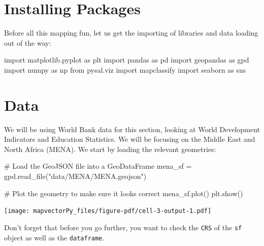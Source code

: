 \documentclass[
  letterpaper,
  DIV=11,
  numbers=noendperiod]{scrreprt}
\newenvironment{Shaded}{\begin{snugshade}}{\end{snugshade}}
\newcommand{\CommentTok}[1]{\textcolor[rgb]{0.37,0.37,0.37}{#1}}
\newcommand{\ImportTok}[1]{\textcolor[rgb]{0.00,0.46,0.62}{#1}}
\newcommand{\NormalTok}[1]{\textcolor[rgb]{0.00,0.23,0.31}{#1}}
\newcommand{\OperatorTok}[1]{\textcolor[rgb]{0.37,0.37,0.37}{#1}}
\newcommand{\StringTok}[1]{\textcolor[rgb]{0.13,0.47,0.30}{#1}}
\begin{document}
\section*{Installing Packages}\label{installing-packages}


Before all this mapping fun, let us get the importing of libraries and
data loading out of the way:

\begin{Shaded}
\begin{Highlighting}[]
\ImportTok{import}\NormalTok{ matplotlib.pyplot }\ImportTok{as}\NormalTok{ plt}
\ImportTok{import}\NormalTok{ pandas }\ImportTok{as}\NormalTok{ pd}
\ImportTok{import}\NormalTok{ geopandas }\ImportTok{as}\NormalTok{ gpd}
\ImportTok{import}\NormalTok{ numpy }\ImportTok{as}\NormalTok{ np}
\ImportTok{from}\NormalTok{ pysal.viz }\ImportTok{import}\NormalTok{ mapclassify}
\ImportTok{import}\NormalTok{ seaborn }\ImportTok{as}\NormalTok{ sns}
\end{Highlighting}
\end{Shaded}

\section*{Data}\label{data}


We will be using World Bank data for this section, looking at World
Development Indicators and Education Statistics. We will be focusing on
the Middle East and North Africa (MENA). We start by loading the
relevant geometries:

\begin{Shaded}
\begin{Highlighting}[]
\CommentTok{\# Load the GeoJSON file into a GeoDataFrame}
\NormalTok{mena\_sf }\OperatorTok{=}\NormalTok{ gpd.read\_file(}\StringTok{"data/MENA/MENA.geojson"}\NormalTok{)}

\CommentTok{\# Plot the geometry to make sure it looks correct}
\NormalTok{mena\_sf.plot()}
\NormalTok{plt.show()}
\end{Highlighting}
\end{Shaded}

\texttt{[image: mapvectorPy\_files/figure-pdf/cell-3-output-1.pdf]}

Don't forget that before you go further, you want to check the
\texttt{CRS} of the \texttt{sf} object as well as the
\texttt{dataframe}.
\end{document}
